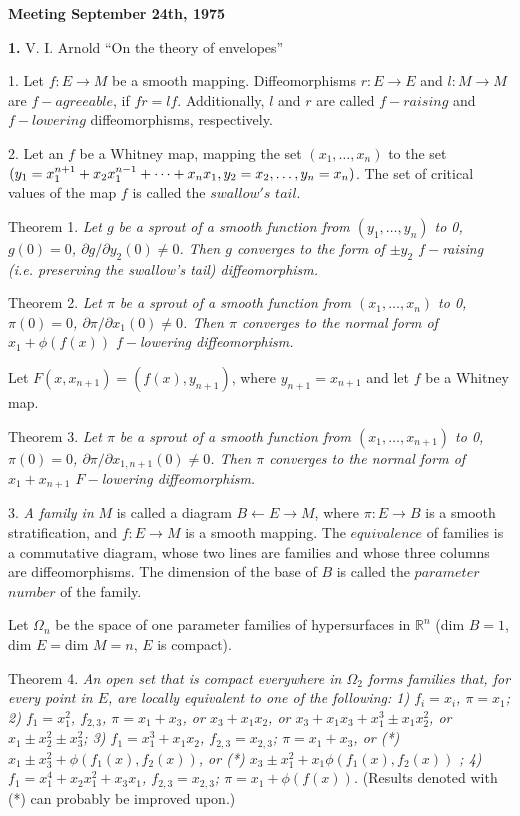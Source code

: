 \documentclass{article}
\begin{document}
\large\noindent\textbf{Meeting September 24th, 1975}

\textbf{1.} V. I. Arnold ``On the theory of envelopes''

\normalsize1\degree.
Let $f:E\to M$ be a smooth mapping.
Diffeomorphisms $r:E\to E$ and $l:M\to M$ are $f-agreeable$, if $fr=lf$.
Additionally, $l$ and $r$ are called $f-raising$ and $f-lowering$
diffeomorphisms, respectively.

2\degree.
Let an $f$ be a Whitney map, mapping the set
$(x_1,\dots,x_n)$ to the set$(\smash{y_1=x_1^{n+1}+x_2x_1^{n-1}+\dots+x_nx_1},
y_2=x_2,\dots,y_n=x_n)$.
The set of critical values of the map $f$ is called the $swallow's$ $tail$.

Theorem 1.
\textit{Let $g$ be a sprout of a smooth function from
$(y_1,\dots,y_n)$ to 0, $g(0)=0$, $\partial g/\partial y_2(0)\neq0$.
Then $g$ converges to the form of $\pm y_2$ $f-$raising (i.e. preserving the
swallow's tail) diffeomorphism.}

Theorem 2.
\textit{Let $\pi$ be a sprout of a smooth function from
$(x_1,\dots,x_n)$ to 0, $\pi(0)=0$, $\partial\pi/\partial x_1(0)\neq0$.
Then $\pi$ converges to the normal form of $x_1+\phi(f(x))$ $f-$lowering
diffeomorphism.}

Let $F(x,x_{n+1})=(f(x),y_{n+1})$, where $y_{n+1}=x_{n+1}$ and let $f$ be a
Whitney map.

Theorem 3.
\textit{Let $\pi$ be a sprout of a smooth function from
$(x_1,\dots,x_{n+1})$ to 0, $\pi(0)=0$,
$\partial\pi/\partial x_{1,n+1}(0)\neq0$.
Then $\pi$ converges to the normal form of $x_1+x_{n+1}$ $F-$lowering
diffeomorphism.}

3\degree.
\textit{A family in} $M$ is called a diagram $B\leftarrow E\to M$, where
$\pi:E\to B$ is a smooth stratification, and $f:E\to M$ is a smooth mapping.
The $equivalence$ of families is a commutative diagram, whose two lines are
families and whose three columns are diffeomorphisms.
The dimension of the base of $B$ is called the $parameter$ $number$ of the
family.

Let $\Omega_n$ be the space of one parameter families of hypersurfaces in
$\mathbb{R}^n$ (dim $B=1$, dim $E=$dim $M=n$, $E$ is compact).

Theorem 4.
\textit{An open set that is compact everywhere in $\Omega_2$ forms families
that, for every point in $E$, are locally equivalent to one of the following:
1) $f_i=x_i$, $\pi=x_1$; 2) $f_1=x_1^2$, $f_{2,3}$, $\pi=x_1+x_3$, or
$x_3+x_1x_2$, or $x_3+x_1x_3+x_1^3\pm x_1x_2^2$, or $x_1\pm x_2^2\pm x_3^2$;
3) $f_1=x_1^3+x_1x_2$, $f_{2,3}=x_{2,3}$; $\pi=x_1+x_3$, or (*)
$x_1\pm x_3^2+\phi(f_1(x),f_2(x))$, or (*) $x_3\pm x_1^2+x_1\phi(f_1(x),f_2(x))$
; 4) $f_1=x_1^4+x_2x_1^2+x_3x_1$, $f_{2,3}=x_{2,3}$; $\pi=x_1+\phi(f(x))$.}
(Results denoted with (*) can probably be improved upon.)
\end{document}
